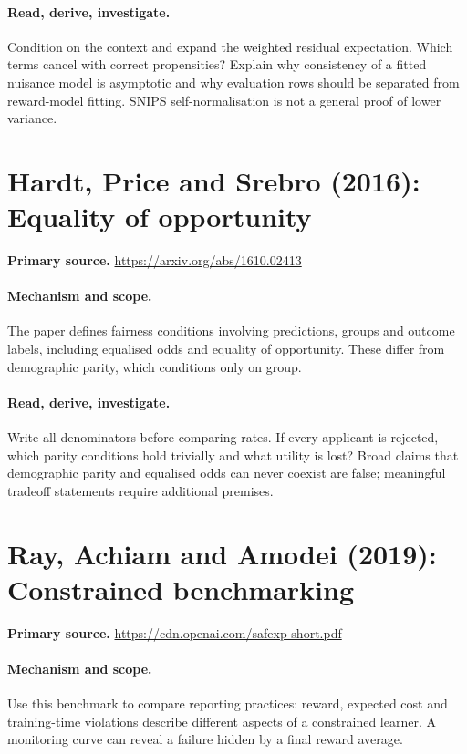 \documentclass[11pt]{scrartcl}
\begin{document}
\paragraph{Read, derive, investigate.} Condition on the context and expand the weighted residual expectation. Which terms cancel with correct propensities? Explain why consistency of a fitted nuisance model is asymptotic and why evaluation rows should be separated from reward-model fitting. SNIPS self-normalisation is not a general proof of lower variance.

\section{Hardt, Price and Srebro (2016): Equality of opportunity}
\noindent\textbf{Primary source.} \url{https://arxiv.org/abs/1610.02413}

\paragraph{Mechanism and scope.} The paper defines fairness conditions involving predictions, groups and outcome labels, including equalised odds and equality of opportunity. These differ from demographic parity, which conditions only on group.

\paragraph{Read, derive, investigate.} Write all denominators before comparing rates. If every applicant is rejected, which parity conditions hold trivially and what utility is lost? Broad claims that demographic parity and equalised odds can never coexist are false; meaningful tradeoff statements require additional premises.

\section{Ray, Achiam and Amodei (2019): Constrained benchmarking}
\noindent\textbf{Primary source.} \url{https://cdn.openai.com/safexp-short.pdf}

\paragraph{Mechanism and scope.} Use this benchmark to compare reporting practices: reward, expected cost and training-time violations describe different aspects of a constrained learner. A monitoring curve can reveal a failure hidden by a final reward average.
\end{document}

